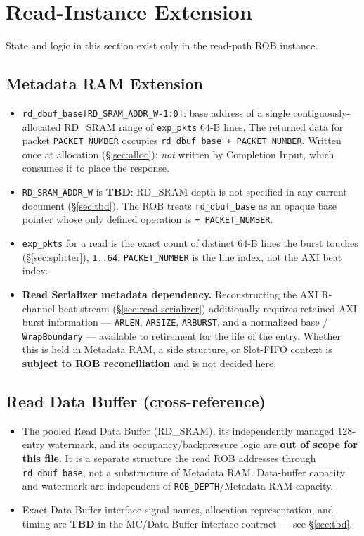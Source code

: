 \section{Read-Instance Extension}
\label{sec:read}

State and logic in this section exist only in the read-path ROB instance.

\subsection{Metadata RAM Extension}
\begin{itemize}[noitemsep]
  \item \texttt{rd\_dbuf\_base[RD\_SRAM\_ADDR\_W-1:0]}: base address of a single contiguously-allocated RD\_SRAM range of \texttt{exp\_pkts} 64-B lines. The returned data for packet \texttt{PACKET\_NUMBER} occupies \texttt{rd\_dbuf\_base + PACKET\_NUMBER}. Written once at allocation (\S\ref{sec:alloc}); \emph{not} written by Completion Input, which consumes it to place the response.
  \item \texttt{RD\_SRAM\_ADDR\_W} is \textbf{TBD}: RD\_SRAM depth is not specified in any current document (\S\ref{sec:tbd}). The ROB treats \texttt{rd\_dbuf\_base} as an opaque base pointer whose only defined operation is \texttt{+ PACKET\_NUMBER}.
  \item \texttt{exp\_pkts} for a read is the exact count of distinct 64-B lines the burst touches (\S\ref{sec:splitter}), \texttt{1..64}; \texttt{PACKET\_NUMBER} is the line index, not the AXI beat index.
  \item \textbf{Read Serializer metadata dependency.} Reconstructing the AXI R-channel beat stream (\S\ref{sec:read-serializer}) additionally requires retained AXI burst information --- \texttt{ARLEN}, \texttt{ARSIZE}, \texttt{ARBURST}, and a normalized base / \texttt{WrapBoundary} --- available to retirement for the life of the entry. Whether this is held in Metadata RAM, a side structure, or Slot-FIFO context is \textbf{subject to ROB reconciliation} and is not decided here.
\end{itemize}

\subsection{Read Data Buffer (cross-reference)}
\begin{itemize}[noitemsep]
  \item The pooled Read Data Buffer (RD\_SRAM), its independently managed 128-entry watermark, and its occupancy/backpressure logic are \textbf{out of scope for this file}.  It is a separate structure the read ROB addresses through \texttt{rd\_dbuf\_base}, not a substructure of Metadata RAM. Data-buffer capacity and watermark are independent of \texttt{ROB\_DEPTH}/Metadata RAM capacity.
  \item Exact Data Buffer interface signal names, allocation representation, and timing are \textbf{TBD} in the MC/Data-Buffer interface contract --- see \S\ref{sec:tbd}.
\end{itemize}

